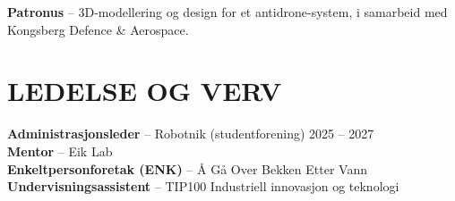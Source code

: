 \documentclass[a4paper,10pt]{article}
\begin{document}
\noindent\textbf{Patronus} -- 3D-modellering og design for et antidrone-system, i samarbeid med Kongsberg Defence \& Aerospace.

\section{LEDELSE OG VERV}

\noindent\textbf{Administrasjonsleder} -- Robotnik (studentforening) \hfill {\small\color{mid} 2025 -- 2027}\\[0.15ex]

\noindent\textbf{Mentor} -- Eik Lab\\[0.15ex]

\noindent\textbf{Enkeltpersonforetak (ENK)} -- Å Gå Over Bekken Etter Vann\\[0.15ex]

\noindent\textbf{Undervisningsassistent} -- TIP100 Industriell innovasjon og teknologi
\end{document}
